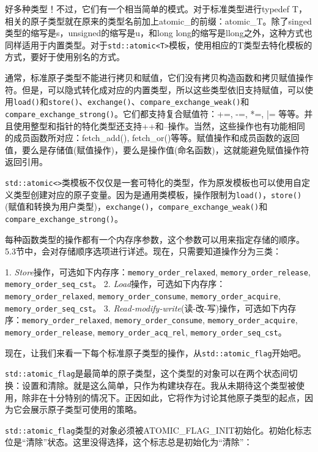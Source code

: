好多种类型！不过，它们有一个相当简单的模式。对于标准类型进行typedef T，相关的原子类型就在原来的类型名前加上atomic\_的前缀：atomic\_T。除了singed类型的缩写是s，unsigned的缩写是u，和long long的缩写是llong之外，这种方式也同样适用于内置类型。对于\texttt{std::atomic<T>}模板，使用相应的T类型去特化模板的方式，要好于使用别名的方式。

通常，标准原子类型不能进行拷贝和赋值，它们没有拷贝构造函数和拷贝赋值操作符。但是，可以隐式转化成对应的内置类型，所以这些类型依旧支持赋值，可以使用\texttt{load()}和\texttt{store()}、\texttt{exchange()}、\texttt{compare\_exchange\_weak()}和\texttt{compare\_exchange\_strong()}。它们都支持复合赋值符：+=, -=, *=, |= 等等。并且使用整型和指针的特化类型还支持++和--操作。当然，这些操作也有功能相同的成员函数所对应：fetch\_add(), fetch\_or()等等。赋值操作和成员函数的返回值，要么是存储值(赋值操作)，要么是操作值(命名函数)，这就能避免赋值操作符返回引用。

\texttt{std::atomic<>}类模板不仅仅是一套可特化的类型，作为原发模板也可以使用自定义类型创建对应的原子变量。因为是通用类模板，操作限制为\texttt{load()}，\texttt{store()}(赋值和转换为用户类型)，\texttt{exchange()}，\texttt{compare\_exchange\_weak()}和\texttt{compare\_exchange\_strong()}。

每种函数类型的操作都有一个内存序参数，这个参数可以用来指定存储的顺序。5.3节中，会对存储顺序选项进行详述。现在，只需要知道操作分为三类：

1. \textit{Store}操作，可选如下内存序：\texttt{memory\_order\_relaxed}, \texttt{memory\_order\_release}, \texttt{memory\_order\_seq\_cst}。
2. \textit{Load}操作，可选如下内存序：\texttt{memory\_order\_relaxed}, \texttt{memory\_order\_consume}, \texttt{memory\_order\_acquire}, \texttt{memory\_order\_seq\_cst}。
3. \textit{Read-modify-write}(读-改-写)操作，可选如下内存序：\texttt{memory\_order\_relaxed}, \texttt{memory\_order\_consume}, \texttt{memory\_order\_acquire}, \texttt{memory\_order\_release}, \texttt{memory\_order\_acq\_rel}, \texttt{memory\_order\_seq\_cst}。

现在，让我们来看一下每个标准原子类型的操作，从\texttt{std::atomic\_flag}开始吧。


\texttt{std::atomic\_flag}是最简单的原子类型，这个类型的对象可以在两个状态间切换：设置和清除。就是这么简单，只作为构建块存在。我从未期待这个类型被使用，除非在十分特别的情况下。正因如此，它将作为讨论其他原子类型的起点，因为它会展示原子类型可使用的策略。

\texttt{std::atomic\_flag}类型的对象必须被ATOMIC\_FLAG\_INIT初始化。初始化标志位是“清除”状态。这里没得选择，这个标志总是初始化为“清除”：

